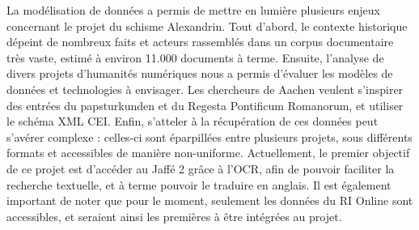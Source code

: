 La modélisation de données a permis de mettre en lumière plusieurs enjeux concernant le projet du schisme Alexandrin. Tout d’abord, le contexte historique dépeint de nombreux faits et acteurs rassemblés dans un corpus documentaire très vaste, estimé à environ 11.000 documents à terme. Ensuite, l’analyse de divers projets d’humanités numériques nous a permis d’évaluer les modèles de données et technologies à envisager. Les chercheurs de Aachen veulent s’inspirer des entrées du papsturkunden et du Regesta Pontificum Romanorum, et utiliser le schéma XML CEI. Enfin, s’atteler à la récupération de ces données peut s'avérer complexe :  celles-ci sont éparpillées entre plusieurs projets, sous différents formats et accessibles de manière non-uniforme. Actuellement, le premier objectif de ce projet est d’accéder au Jaffé 2 grâce à l’OCR, afin de pouvoir faciliter la recherche textuelle, et à terme pouvoir le traduire en anglais. Il est également important de noter que pour le moment, seulement les données du RI Online sont accessibles, et seraient ainsi les premières à être intégrées au projet.